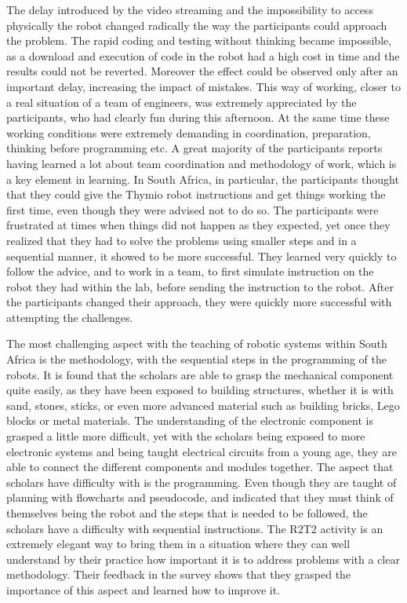 \documentclass{intech-journal}
\begin{document}
The delay introduced by the video streaming and the impossibility to access physically the robot changed radically the way the participants could approach the problem.
The rapid coding and testing without thinking became impossible, as a download and execution of code in the robot had a high cost in time and the results could not be reverted. 
Moreover the effect could be observed only after an important delay, increasing the impact of mistakes.
This way of working, closer to a real situation of a team of engineers, was extremely appreciated by the participants, who had clearly fun during this afternoon.
At the same time these working conditions were extremely demanding in coordination, preparation, thinking before programming etc. 
A great majority of the participants reports having learned a lot about team coordination and methodology of work, which is a key element in learning.
In South Africa, in particular, the participants thought that they could give the Thymio robot instructions and get things working the first time, even though they were advised not to do so. 
The participants were frustrated at times when things did not happen as they expected, yet once they realized that they had to solve the problems using smaller steps and in a sequential manner, it showed to be more successful. 
They learned very quickly to follow the advice, and to work in a team, to first simulate instruction on the robot they had within the lab, before sending the instruction to the robot.
After the participants changed their approach, they were quickly more successful with attempting the challenges. 

The most challenging aspect with the teaching of robotic systems within South Africa is the methodology, with the sequential steps in the programming of the robots. 
It is found that the scholars are able to grasp the mechanical component quite easily, as they have been exposed to building structures, whether it is with sand, stones, sticks, or even more advanced material such as building bricks, Lego blocks or metal materials. 
The understanding of the electronic component is grasped a little more difficult, yet with the scholars being exposed to more electronic systems and being taught electrical circuits from a young age, they are able to connect the different components and modules together. 
The aspect that scholars have difficulty with is the programming. 
Even though they are taught of planning with flowcharts and pseudocode, and indicated that they must think of themselves being the robot and the steps that is needed to be followed, the scholars have a difficulty with sequential instructions. 
The R2T2 activity is an extremely elegant way to bring them in a situation where they can well understand by their practice how important it is to address problems with a clear methodology. 
Their feedback in the survey shows that they grasped the importance of this aspect and learned how to improve it.
\end{document}
